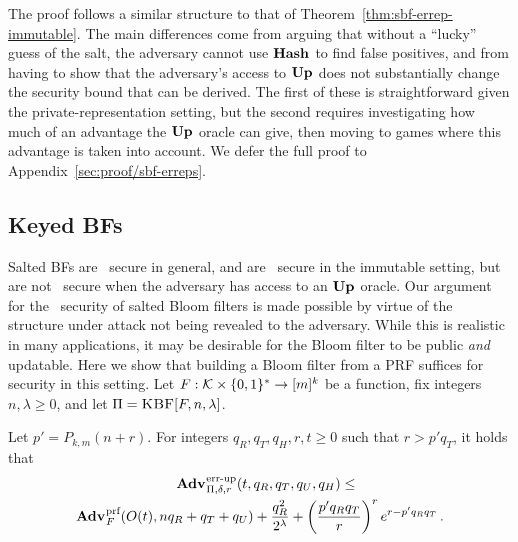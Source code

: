 The proof follows a similar structure to that of
Theorem~\ref{thm:sbf-errep-immutable}. The main differences come from arguing
that without a ``lucky'' guess of the salt, the adversary cannot use $\textup{\textbf{Hash}}\hspace{0.5pt}$ to
find false positives, and from having to show that the adversary's access to
$\textup{\textbf{Up}}\hspace{0.5pt}$ does not substantially change the security bound that can be derived. The
first of these is straightforward given the private-representation setting, but
the second requires investigating how much of an advantage the $\textup{\textbf{Up}}\hspace{0.5pt}$ oracle can
give, then moving to games where this advantage is taken into account. We defer
the full proof to Appendix~\ref{sec:proof/sbf-erreps}.

%  

\subsection{Keyed BFs}

Salted BFs are \erreps\ secure in general, and are \errep\ secure in the
immutable setting, but are not \errep\ secure when the adversary has access to
an $\textup{\textbf{Up}}\hspace{0.5pt}$ oracle. Our argument for the \erreps\ security of
salted Bloom filters is made possible by virtue of the structure under attack
not being revealed to the adversary. While this is realistic in many
applications, it may be desirable for the Bloom filter to be public \emph{and}
updatable.
%
Here we show that building a Bloom filter from a PRF suffices for security in
this setting.
%
Let $F:\mathcal{K}\times\{0,1\}^*\to[m]^k$ be a function, fix
integers~$n,\lambda\geq0$, and let $\Pi = \textnormal{\textsc{KBF}}[F,n,\lambda]$.

\begin{theorem}
\label{thm:bf-key-bound}
\label{thm:kbf-errep}
  Let $p' = P_{k,m}(n+r)$.  For integers $q_R, q_T, q_H, r, t \geq 0$ such that
  $r > p'q_T$, it holds that
  \begin{equation*}
    \begin{aligned}
      \Adv{\errep}_{\Pi,\delta,r}(t,\,&q_R,q_T,q_U,q_H) \leq \\
        \Adv{\prf}_F(O(t),nq_R+q_T+q_U) & +
      \frac{q_R^2}{2^\lambda} +
      \left(\frac{p'q_Rq_T}{r}\right)^re^{r-p'q_Rq_T} \,.
    \end{aligned}
  \end{equation*}
\end{theorem}

